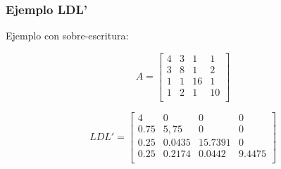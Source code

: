 \documentclass[10pt]{beamer}
\begin{document}
\begin{frame}[fragile]

\frametitle{Ejemplo LDL'} 
Ejemplo con sobre-escritura:

\[
A=
  \begin{bmatrix}
    4 & 3 & 1 & 1 \\
    3 & 8 & 1 & 2 \\
    1 & 1 & 16 & 1 \\
    1 & 2 & 1 & 10 \\
  \end{bmatrix}
\]

\[
LDL'=
  \begin{bmatrix}
    4 & 0 & 0 & 0 \\
    0.75 & 5,75 & 0 & 0 \\
    0.25 & 0.0435 & 15.7391 & 0 \\
    0.25 & 0.2174 & 0.0442 & 9.4475 \\
  \end{bmatrix}
\]

\end{frame}
\end{document}
